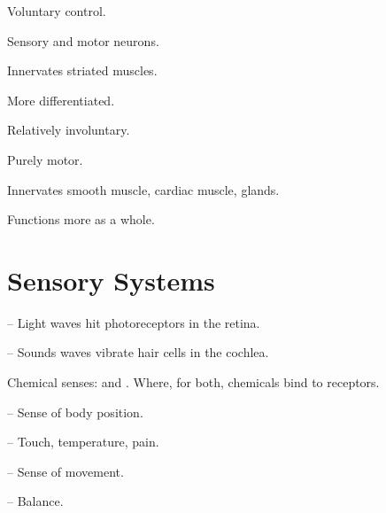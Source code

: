 \begin{coloredlist}
    \item {} 
    \begin{coloredlist}
        \item Voluntary control.
        \item Sensory and motor neurons.
        \item Innervates striated muscles.
        \item More differentiated.
    \end{coloredlist}
    \item {}
    \begin{coloredlist}
        \item Relatively involuntary.
        \item Purely motor.
        \item Innervates smooth muscle, cardiac muscle, glands.
        \item Functions more as a whole.
    \end{coloredlist}
\end{coloredlist}

\section{Sensory Systems}

\begin{coloredlist}
    \item {} -- Light waves hit photoreceptors in the retina.
    \item {} -- Sounds waves vibrate hair cells in the cochlea.
    \item Chemical senses:  and . Where, for both, chemicals bind to receptors.
    \item {} 
    \begin{coloredlist}
        \item {} -- Sense of body position.
        \item {} -- Touch, temperature, pain.
        \item {} -- Sense of movement.
        \item {} -- Balance.
    \end{coloredlist}
\end{coloredlist}

